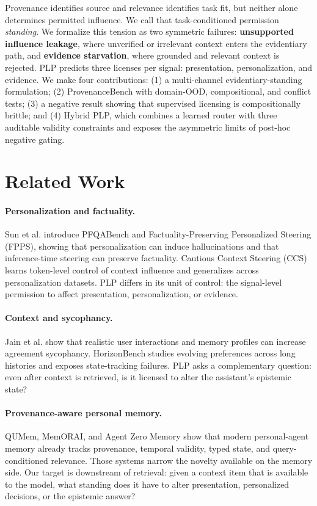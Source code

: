 \documentclass[10pt,twocolumn]{article}
\begin{document}
Provenance identifies source and relevance identifies task fit, but neither alone determines permitted influence. We call that task-conditioned permission \emph{standing}. We formalize this tension as two symmetric failures: \textbf{unsupported influence leakage}, where unverified or irrelevant context enters the evidentiary path, and \textbf{evidence starvation}, where grounded and relevant context is rejected. PLP predicts three licenses per signal: presentation, personalization, and evidence. We make four contributions: (1) a multi-channel evidentiary-standing formulation; (2) ProvenanceBench with domain-OOD, compositional, and conflict tests; (3) a negative result showing that supervised licensing is compositionally brittle; and (4) Hybrid PLP, which combines a learned router with three auditable validity constraints and exposes the asymmetric limits of post-hoc negative gating.

\section{Related Work}
\paragraph{Personalization and factuality.} Sun et al. introduce PFQABench and Factuality-Preserving Personalized Steering (FPPS), showing that personalization can induce hallucinations and that inference-time steering can preserve factuality. Cautious Context Steering (CCS) learns token-level control of context influence and generalizes across personalization datasets. PLP differs in its unit of control: the signal-level permission to affect presentation, personalization, or evidence.

\paragraph{Context and sycophancy.} Jain et al. show that realistic user interactions and memory profiles can increase agreement sycophancy. HorizonBench studies evolving preferences across long histories and exposes state-tracking failures. PLP asks a complementary question: even after context is retrieved, is it licensed to alter the assistant's epistemic state?


\paragraph{Provenance-aware personal memory.} QUMem, MemORAI, and Agent Zero Memory show that modern personal-agent memory already tracks provenance, temporal validity, typed state, and query-conditioned relevance. Those systems narrow the novelty available on the memory side. Our target is downstream of retrieval: given a context item that is available to the model, what standing does it have to alter presentation, personalized decisions, or the epistemic answer?
\end{document}
